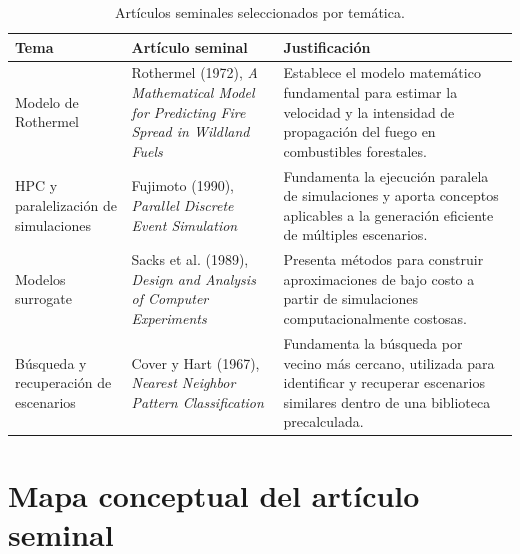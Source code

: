 \begin{table}[H]
    \centering
    \renewcommand{\arraystretch}{2.1}
    \begin{tabular}{p{3.2cm}p{5.2cm}p{5.2cm}}
        \toprule
        \textbf{Tema} & \textbf{Artículo seminal} & \textbf{Justificación} \\
        \midrule
        Modelo de Rothermel & Rothermel (1972), \textit{A Mathematical Model for Predicting Fire Spread in Wildland Fuels} & Establece el modelo matemático fundamental para estimar la velocidad y la intensidad de propagación del fuego en combustibles forestales. \\
        HPC y paralelización de simulaciones & Fujimoto (1990), \textit{Parallel Discrete Event Simulation} & Fundamenta la ejecución paralela de simulaciones y aporta conceptos aplicables a la generación eficiente de múltiples escenarios. \\
        Modelos surrogate & Sacks et al. (1989), \textit{Design and Analysis of Computer Experiments} & Presenta métodos para construir aproximaciones de bajo costo a partir de simulaciones computacionalmente costosas. \\
        Búsqueda y recuperación de escenarios & Cover y Hart (1967), \textit{Nearest Neighbor Pattern Classification} & Fundamenta la búsqueda por vecino más cercano, utilizada para identificar y recuperar escenarios similares dentro de una biblioteca precalculada. \\
        \bottomrule
    \end{tabular}
    \caption{Artículos seminales seleccionados por temática.}
\end{table}

\section{Mapa conceptual del artículo seminal}
